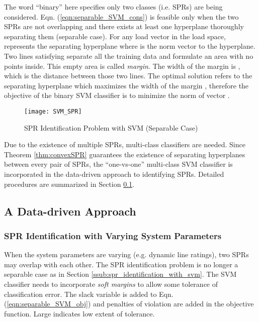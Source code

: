 \documentclass[letterpaper, 11pt]{article}
\theoremstyle{plain}
\theoremstyle{definition}
\begin{document}
The word ``binary'' here specifies only two classes (i.e. SPRs) are being considered. Eqn. (\ref{eqn:separable_SVM_cons}) is feasible only when the two SPRs are not overlapping and there exists at least one hyperplane thoroughly separating them (separable case). For any load vector  in the load space, 
 represents the separating hyperplane where  is the norm vector to the hyperplane. Two lines satisfying  separate all the training data and formulate an area with no points inside. This empty area is called \emph{margin}. The width of the margin is , which is the distance between those two lines. The optimal solution refers to the separating hyperplane which maximizes the width of the margin , therefore the objective of the binary SVM classifier is to minimize the norm of vector .
\begin{figure}[htbp]
  \centering
  \texttt{[image: SVM\_SPR]}
  \caption{SPR Identification Problem with SVM (Separable Case)}
  \label{fig:SVM_SPR}
\end{figure}






Due to the existence of multiple SPRs, multi-class classifiers are needed. Since Theorem \ref{thm:convexSPR} guarantees the existence of separating hyperplanes between every pair of SPRs, the ``one-vs-one'' multi-class SVM classifier is incorporated in the data-driven approach to identifying SPRs. Detailed procedures are summarized in Section \ref{sub:extended_data_driven_approach}.






\subsection{A Data-driven Approach} \label{sub:extended_data_driven_approach}
\subsubsection{SPR Identification with Varying System Parameters} \label{ssub:spr_identification_with_varying_system_parameters}
When the system parameters are varying (e.g. dynamic line ratings), two SPRs may overlap with each other. The SPR identification problem is no longer a separable case as in Section \ref{ssub:spr_identification_with_svm}. The SVM classifier needs to incorporate \emph{soft margins} to allow some tolerance of classification error. The slack variable  is added to Eqn. (\ref{eqn:separable_SVM_obj}) and penalties of violation  are added in the objective function. Large  indicates low extent of tolerance.
\end{document}
